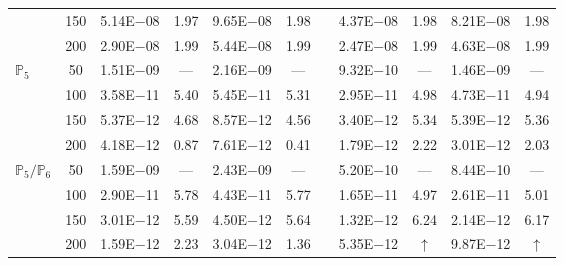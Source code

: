 \begin{table}[H]
{\begin{tabular}{@{}l c c c c c c c c c c@{}}
 & 150 & 5.14E$-$08 & 1.97  & 9.65E$-$08 & 1.98 &  & 4.37E$-$08 & 1.98 & 8.21E$-$08 & 1.98\\
 & 200 & 2.90E$-$08 & 1.99  & 5.44E$-$08 & 1.99 &  & 2.47E$-$08 & 1.99 & 4.63E$-$08 & 1.99\\
\midrule
\multirow{4}{*}{$\mathbb{P}_{5}$}
 & 50 & 1.51E$-$09 & ---  & 2.16E$-$09 & --- &  & 9.32E$-$10 & --- & 1.46E$-$09 & ---\\
 & 100 & 3.58E$-$11 & 5.40  & 5.45E$-$11 & 5.31 &  & 2.95E$-$11 & 4.98 & 4.73E$-$11 & 4.94\\
 & 150 & 5.37E$-$12 & 4.68  & 8.57E$-$12 & 4.56 &  & 3.40E$-$12 & 5.34 & 5.39E$-$12 & 5.36\\
 & 200 & 4.18E$-$12 & 0.87  & 7.61E$-$12 & 0.41 &  & 1.79E$-$12 & 2.22 & 3.01E$-$12 & 2.03\\
\midrule
\multirow{4}{*}{$\mathbb{P}_{5}/\mathbb{P}_{6}$}
 & 50 & 1.59E$-$09 & ---  & 2.43E$-$09 & --- &  & 5.20E$-$10 & --- & 8.44E$-$10 & ---\\
 & 100 & 2.90E$-$11 & 5.78  & 4.43E$-$11 & 5.77 &  & 1.65E$-$11 & 4.97 & 2.61E$-$11 & 5.01\\
 & 150 & 3.01E$-$12 & 5.59  & 4.50E$-$12 & 5.64 &  & 1.32E$-$12 & 6.24 & 2.14E$-$12 & 6.17\\
 & 200 & 1.59E$-$12 & 2.23  & 3.04E$-$12 & 1.36 &  & 5.35E$-$12 & $\uparrow$ & 9.87E$-$12 & $\uparrow$\\
\bottomrule
\end{tabular}}
\label{none}
\end{table}
